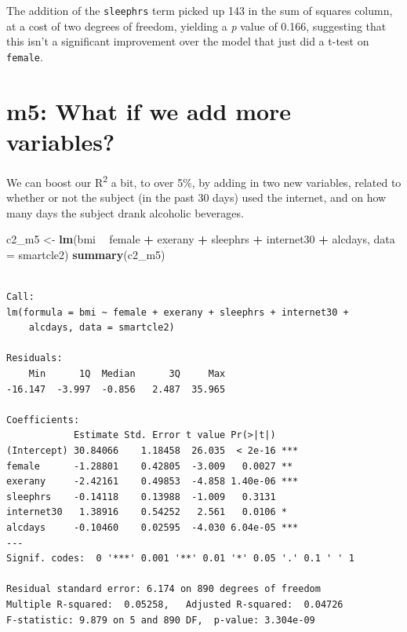 \documentclass[]{book}
\newenvironment{Shaded}{\begin{snugshade}}{\end{snugshade}}
\newcommand{\KeywordTok}[1]{\textcolor[rgb]{0.13,0.29,0.53}{\textbf{#1}}}
\newcommand{\DataTypeTok}[1]{\textcolor[rgb]{0.13,0.29,0.53}{#1}}
\newcommand{\StringTok}[1]{\textcolor[rgb]{0.31,0.60,0.02}{#1}}
\newcommand{\OperatorTok}[1]{\textcolor[rgb]{0.81,0.36,0.00}{\textbf{#1}}}
\newcommand{\NormalTok}[1]{#1}
\theoremstyle{definition}
\theoremstyle{definition}
\theoremstyle{definition}
\theoremstyle{remark}
\begin{document}
The addition of the \texttt{sleephrs} term picked up 143 in the sum of
squares column, at a cost of two degrees of freedom, yielding a \emph{p}
value of 0.166, suggesting that this isn't a significant improvement
over the model that just did a t-test on \texttt{female}.

\section{m5: What if we add more
variables?}\label{m5-what-if-we-add-more-variables}

We can boost our R\textsuperscript{2} a bit, to over 5\%, by adding in
two new variables, related to whether or not the subject (in the past 30
days) used the internet, and on how many days the subject drank
alcoholic beverages.

\begin{Shaded}
\begin{Highlighting}[]
\NormalTok{c2_m5 <-}\StringTok{ }\KeywordTok{lm}\NormalTok{(bmi }\OperatorTok{~}\StringTok{ }\NormalTok{female }\OperatorTok{+}\StringTok{ }\NormalTok{exerany }\OperatorTok{+}\StringTok{ }\NormalTok{sleephrs }\OperatorTok{+}\StringTok{ }\NormalTok{internet30 }\OperatorTok{+}\StringTok{ }\NormalTok{alcdays,}
         \DataTypeTok{data =}\NormalTok{ smartcle2)}
\KeywordTok{summary}\NormalTok{(c2_m5)}
\end{Highlighting}
\end{Shaded}

\begin{verbatim}

Call:
lm(formula = bmi ~ female + exerany + sleephrs + internet30 + 
    alcdays, data = smartcle2)

Residuals:
    Min      1Q  Median      3Q     Max 
-16.147  -3.997  -0.856   2.487  35.965 

Coefficients:
            Estimate Std. Error t value Pr(>|t|)    
(Intercept) 30.84066    1.18458  26.035  < 2e-16 ***
female      -1.28801    0.42805  -3.009   0.0027 ** 
exerany     -2.42161    0.49853  -4.858 1.40e-06 ***
sleephrs    -0.14118    0.13988  -1.009   0.3131    
internet30   1.38916    0.54252   2.561   0.0106 *  
alcdays     -0.10460    0.02595  -4.030 6.04e-05 ***
---
Signif. codes:  0 '***' 0.001 '**' 0.01 '*' 0.05 '.' 0.1 ' ' 1

Residual standard error: 6.174 on 890 degrees of freedom
Multiple R-squared:  0.05258,   Adjusted R-squared:  0.04726 
F-statistic: 9.879 on 5 and 890 DF,  p-value: 3.304e-09
\end{verbatim}
\end{document}
